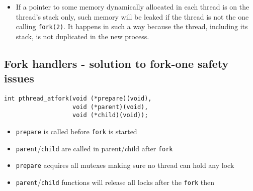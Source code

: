 \begin{center}
\end{center}

\begin{itemize}
\item If a pointer to some memory dynamically allocated in each thread is on the
thread's stack only, such memory will be leaked if the thread is not the one
calling \texttt{fork(2)}. It happens in such a way because the thread, including
its stack, is not duplicated in the new process.
\end{itemize}


\subsection{Fork handlers - solution to fork-one safety issues}

\begin{verbatim}
int pthread_atfork(void (*prepare)(void),
                   void (*parent)(void),
                   void (*child)(void));
\end{verbatim}

\begin{itemize}
\item \texttt{prepare} is called before \texttt{fork} is started
\item \texttt{parent}/\texttt{child} are called in parent/child after
\texttt{fork}
\item \texttt{prepare} acquires all mutexes making sure no thread can hold any
lock
\item \texttt{parent}/\texttt{child} functions will release all locks after the
\texttt{fork} then
\end{itemize}

